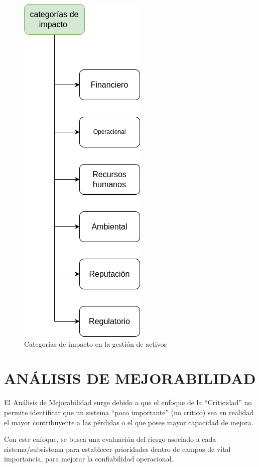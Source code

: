 \documentclass[a5paper]{book}%
\begin{document}
  \begin{figure}[H]
    \centering
    \caption{Categorías de impacto en la gestión de activos}
    \label{fig:impacto}
    \includegraphics[width=0.45\linewidth]{categorias_impacto}
  \end{figure}

  \section{ANÁLISIS DE MEJORABILIDAD}

  El Análisis de Mejorabilidad surge debido a que el enfoque de la “Criticidad” no permite identificar que un sistema “poco importante” (no critico) sea en realidad el mayor contribuyente a las pérdidas o el que posee mayor capacidad de mejora.

Con este enfoque, se busca una evaluación del riesgo asociado a cada sistema/subsistema para establecer prioridades dentro de campos de vital importancia, para mejorar la confiabilidad operacional.
\end{document}

